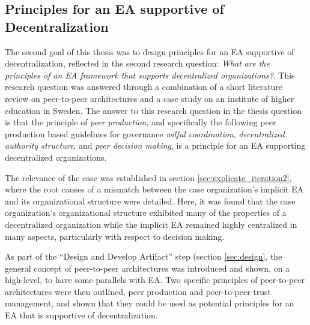 \subsection{Principles for an EA supportive of Decentralization}

The second goal of this thesis was to design principles for an EA supportive of decentralization, reflected in the second research question: \textit{What are the principles of an EA framework that supports decentralized organizations?}.  This research question was answered through a combination of a short literature review on peer-to-peer architectures and a case study on an institute of higher education in Sweden. The answer to this research question in the thesis question is that the principle of \textit{peer production}, and specifically the following peer production based guidelines for governance \textit{wilful coordination}, \textit{decentralized authority structure}, and \textit{peer decision making}, is a principle for an EA supporting decentralized organizations. 

The relevance of the case was established in section \ref{sec:explicate_iteration2}, where the root causes of a mismatch between the case organization's implicit EA and its organizational structure were detailed. Here, it was found that the case organization's organizational structure exhibited many of the properties of a decentralized organization while the implicit EA remained highly centralized in many aspects, particularly with respect to decision making. 

As part of the ``Design and Develop Artifact'' step (section \ref{sec:design}, the general concept of peer-to-peer architectures was introduced and shown, on a high-level, to have some parallels with EA. Two specific principles of peer-to-peer architectures were then outlined, peer production and peer-to-peer trust management, and shown that they could be used as potential principles for an EA that is supportive of decentralization. 

